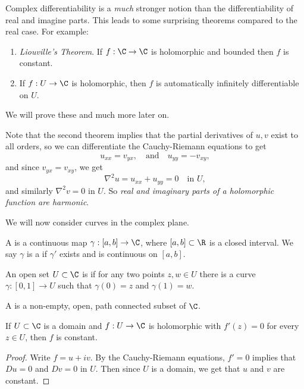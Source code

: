 Complex differentiability is a \emph{much} stronger notion than the differentiability of real and imagine parts. This leads to some surprising theorems compared to the real case. For example: 
\begin{enumerate}[label=(\alph*)]
    \item \emph{Liouville's Theorem}. If $f: \C \rightarrow \C$ is holomorphic and bounded then $f$ is constant.
    \item If $f: U \rightarrow \C$ is holomorphic, then $f$ is automatically infinitely differentiable on $U$.
\end{enumerate}
We will prove these and much more later on.

\begin{remark}
Note that the second theorem implies that the partial derivatives of $u, v$ exist to all orders, so we can differentiate the Cauchy-Riemann equations to get
$$
u_{xx} = v_{yx}, \quad \text{and} \quad u_{yy} = -v_{xy},
$$
and since $v_{yx} = v_{xy}$, we get
$$
\nabla^2 u = u_{xx} + u_{yy} = 0 \quad \text{in }U, 
$$
and similarly $\nabla^2 v = 0$ in $U$. So \emph{real and imaginary parts of a holomorphic function are harmonic}.
\end{remark}

We will now consider curves in the complex plane.

\begin{definition}[Curve]
A  is a continuous map $\gamma: [a, b] \rightarrow \C$, where $[a, b] \subset \R$ is a closed interval. We say $\gamma$ is a  if $\gamma'$ exists and is continuous on $[a, b]$. 
\end{definition}

\begin{definition}
    An open set $U \subset \C$ is  if for any two points $z, w \in U$ there is a curve $\gamma : [0, 1] \rightarrow U$ such that $\gamma(0) = z$ and $\gamma(1) = w$.
\end{definition}

\begin{definition}[Domain]
    A  is a non-empty, open, path connected subset of $\C$.
\end{definition}

\begin{corollary}
    If $U \subset \C$ is a domain and $f: U \rightarrow \C$ is holomorphic with $f'(z) = 0$ for every $z \in U$, then $f$ is constant.
\end{corollary}
\begin{proof}
    Write $f = u + iv$. By the Cauchy-Riemann equations, $f' = 0$ implies that $Du = 0$ and $Dv = 0$ in $U$. Then since $U$ is a domain, we get that $u$ and $v$ are constant.
\end{proof}

